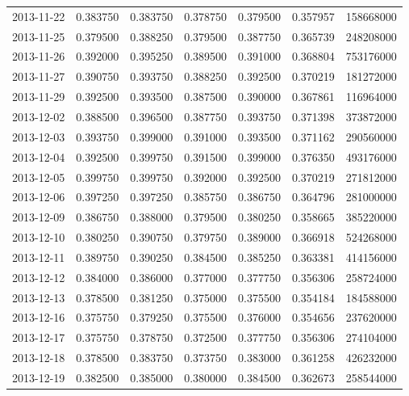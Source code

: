 \begin{tabular}{lrrrrrr}
2013-11-22 &    0.383750 &    0.383750 &    0.378750 &    0.379500 &    0.357957 &   158668000 \\
2013-11-25 &    0.379500 &    0.388250 &    0.379500 &    0.387750 &    0.365739 &   248208000 \\
2013-11-26 &    0.392000 &    0.395250 &    0.389500 &    0.391000 &    0.368804 &   753176000 \\
2013-11-27 &    0.390750 &    0.393750 &    0.388250 &    0.392500 &    0.370219 &   181272000 \\
2013-11-29 &    0.392500 &    0.393500 &    0.387500 &    0.390000 &    0.367861 &   116964000 \\
2013-12-02 &    0.388500 &    0.396500 &    0.387750 &    0.393750 &    0.371398 &   373872000 \\
2013-12-03 &    0.393750 &    0.399000 &    0.391000 &    0.393500 &    0.371162 &   290560000 \\
2013-12-04 &    0.392500 &    0.399750 &    0.391500 &    0.399000 &    0.376350 &   493176000 \\
2013-12-05 &    0.399750 &    0.399750 &    0.392000 &    0.392500 &    0.370219 &   271812000 \\
2013-12-06 &    0.397250 &    0.397250 &    0.385750 &    0.386750 &    0.364796 &   281000000 \\
2013-12-09 &    0.386750 &    0.388000 &    0.379500 &    0.380250 &    0.358665 &   385220000 \\
2013-12-10 &    0.380250 &    0.390750 &    0.379750 &    0.389000 &    0.366918 &   524268000 \\
2013-12-11 &    0.389750 &    0.390250 &    0.384500 &    0.385250 &    0.363381 &   414156000 \\
2013-12-12 &    0.384000 &    0.386000 &    0.377000 &    0.377750 &    0.356306 &   258724000 \\
2013-12-13 &    0.378500 &    0.381250 &    0.375000 &    0.375500 &    0.354184 &   184588000 \\
2013-12-16 &    0.375750 &    0.379250 &    0.375500 &    0.376000 &    0.354656 &   237620000 \\
2013-12-17 &    0.375750 &    0.378750 &    0.372500 &    0.377750 &    0.356306 &   274104000 \\
2013-12-18 &    0.378500 &    0.383750 &    0.373750 &    0.383000 &    0.361258 &   426232000 \\
2013-12-19 &    0.382500 &    0.385000 &    0.380000 &    0.384500 &    0.362673 &   258544000 \\

\end{tabular}
